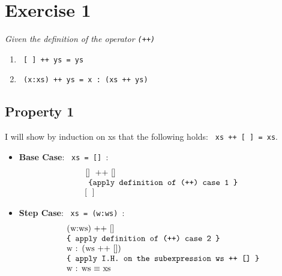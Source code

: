 \documentclass[a4paper]{scrartcl}
\begin{document}
\section*{Exercise 1}
\emph{Given the definition of the operator \lstinline|(++)|}
\begin{enumerate}
	\item \lstinline | [ ] ++ ys = ys|
    \item \lstinline | (x:xs) ++ ys = x : (xs ++ ys) |
\end{enumerate}
\subsection*{Property 1}
I will show by induction on xs that the following holds: \lstinline| xs ++ [ ] = xs|.
\begin{itemize}
\item \textbf{Base Case}: \lstinline| xs = [] |:
	$$
    \begin{array}{l}
    	\text{\lstinline | [] ++ [] |} \\
    	 \texttt{ \{apply definition of (++) case 1 \} }\\
        \text{\lstinline | [ ] |} \\
    \end{array}
	$$
\item \textbf{Step Case}: \lstinline| xs = (w:ws) |:
	$$
	\begin{array}{l}
	\text{\lstinline | (w:ws) ++ [] |} \\
    \texttt{\{ apply definition of (++) case 2 \}} \\
    \text{\lstinline | w : (ws ++ []) | } \\
    \texttt{\{ apply I.H. on the subexpression \lstinline | ws ++ [] | \}} \\
    \text{\lstinline | w : ws | $\equiv$ \lstinline | xs |} \\
    \end{array}
    $$
\end{itemize}
\end{document}
